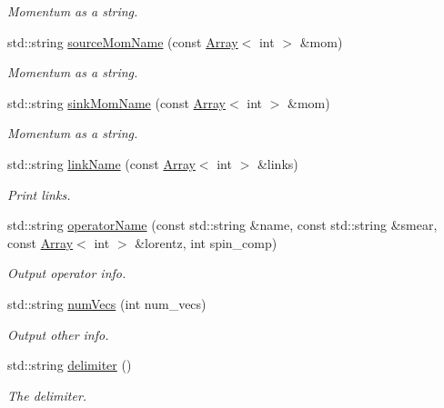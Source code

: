 \begin{DoxyCompactItemize}
\begin{DoxyCompactList}\small\item\em Momentum as a string. \end{DoxyCompactList}\item 
std\+::string \mbox{\hyperlink{namespaceHadron_addad39b9d17263485541d757bb712420}{source\+Mom\+Name}} (const \mbox{\hyperlink{classXMLArray_1_1Array}{Array}}$<$ int $>$ \&mom)
\begin{DoxyCompactList}\small\item\em Momentum as a string. \end{DoxyCompactList}\item 
std\+::string \mbox{\hyperlink{namespaceHadron_aaa6ace3b1a5c63de278a8bcb9fa80c49}{sink\+Mom\+Name}} (const \mbox{\hyperlink{classXMLArray_1_1Array}{Array}}$<$ int $>$ \&mom)
\begin{DoxyCompactList}\small\item\em Momentum as a string. \end{DoxyCompactList}\item 
std\+::string \mbox{\hyperlink{namespaceHadron_afbb540812e62aedb8826e62c56efcff8}{link\+Name}} (const \mbox{\hyperlink{classXMLArray_1_1Array}{Array}}$<$ int $>$ \&links)
\begin{DoxyCompactList}\small\item\em Print links. \end{DoxyCompactList}\item 
std\+::string \mbox{\hyperlink{namespaceHadron_a8f8a77c02a6415ffc31d2a300f59e6a6}{operator\+Name}} (const std\+::string \&name, const std\+::string \&smear, const \mbox{\hyperlink{classXMLArray_1_1Array}{Array}}$<$ int $>$ \&lorentz, int spin\+\_\+comp)
\begin{DoxyCompactList}\small\item\em Output operator info. \end{DoxyCompactList}\item 
std\+::string \mbox{\hyperlink{namespaceHadron_afea9ddb2112da9cb61d87881799fff49}{num\+Vecs}} (int num\+\_\+vecs)
\begin{DoxyCompactList}\small\item\em Output other info. \end{DoxyCompactList}\item 
std\+::string \mbox{\hyperlink{namespaceHadron_a2ea4a74b346adec57d30f2605fc00005}{delimiter}} ()
\begin{DoxyCompactList}\small\item\em The delimiter. \end{DoxyCompactList}\item 

\end{DoxyCompactItemize}
